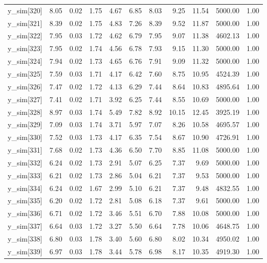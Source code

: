 \begin{table}[ht]
\begin{tabular}{rrrrrrrrrrr}
  y\_sim[320] & 8.05 & 0.02 & 1.75 & 4.67 & 6.85 & 8.03 & 9.25 & 11.54 & 5000.00 & 1.00 \\ 
  y\_sim[321] & 8.39 & 0.02 & 1.75 & 4.83 & 7.26 & 8.39 & 9.52 & 11.87 & 5000.00 & 1.00 \\ 
  y\_sim[322] & 7.95 & 0.03 & 1.72 & 4.62 & 6.79 & 7.95 & 9.07 & 11.38 & 4602.13 & 1.00 \\ 
  y\_sim[323] & 7.95 & 0.02 & 1.74 & 4.56 & 6.78 & 7.93 & 9.15 & 11.30 & 5000.00 & 1.00 \\ 
  y\_sim[324] & 7.94 & 0.02 & 1.73 & 4.65 & 6.76 & 7.91 & 9.09 & 11.32 & 5000.00 & 1.00 \\ 
  y\_sim[325] & 7.59 & 0.03 & 1.71 & 4.17 & 6.42 & 7.60 & 8.75 & 10.95 & 4524.39 & 1.00 \\ 
  y\_sim[326] & 7.47 & 0.02 & 1.72 & 4.13 & 6.29 & 7.44 & 8.64 & 10.83 & 4895.64 & 1.00 \\ 
  y\_sim[327] & 7.41 & 0.02 & 1.71 & 3.92 & 6.25 & 7.44 & 8.55 & 10.69 & 5000.00 & 1.00 \\ 
  y\_sim[328] & 8.97 & 0.03 & 1.74 & 5.49 & 7.82 & 8.92 & 10.15 & 12.45 & 3925.19 & 1.00 \\ 
  y\_sim[329] & 7.09 & 0.03 & 1.74 & 3.71 & 5.97 & 7.07 & 8.26 & 10.58 & 4695.57 & 1.00 \\ 
  y\_sim[330] & 7.52 & 0.03 & 1.73 & 4.17 & 6.35 & 7.54 & 8.67 & 10.90 & 4726.91 & 1.00 \\ 
  y\_sim[331] & 7.68 & 0.02 & 1.73 & 4.36 & 6.50 & 7.70 & 8.85 & 11.08 & 5000.00 & 1.00 \\ 
  y\_sim[332] & 6.24 & 0.02 & 1.73 & 2.91 & 5.07 & 6.25 & 7.37 & 9.69 & 5000.00 & 1.00 \\ 
  y\_sim[333] & 6.21 & 0.02 & 1.73 & 2.86 & 5.04 & 6.21 & 7.37 & 9.53 & 5000.00 & 1.00 \\ 
  y\_sim[334] & 6.24 & 0.02 & 1.67 & 2.99 & 5.10 & 6.21 & 7.37 & 9.48 & 4832.55 & 1.00 \\ 
  y\_sim[335] & 6.20 & 0.02 & 1.72 & 2.81 & 5.08 & 6.18 & 7.37 & 9.61 & 5000.00 & 1.00 \\ 
  y\_sim[336] & 6.71 & 0.02 & 1.72 & 3.46 & 5.51 & 6.70 & 7.88 & 10.08 & 5000.00 & 1.00 \\ 
  y\_sim[337] & 6.64 & 0.03 & 1.72 & 3.27 & 5.50 & 6.64 & 7.78 & 10.06 & 4648.75 & 1.00 \\ 
  y\_sim[338] & 6.80 & 0.03 & 1.78 & 3.40 & 5.60 & 6.80 & 8.02 & 10.34 & 4950.02 & 1.00 \\ 
  y\_sim[339] & 6.97 & 0.03 & 1.78 & 3.44 & 5.78 & 6.98 & 8.17 & 10.35 & 4919.30 & 1.00 \\ 

\end{tabular}
\end{table}
